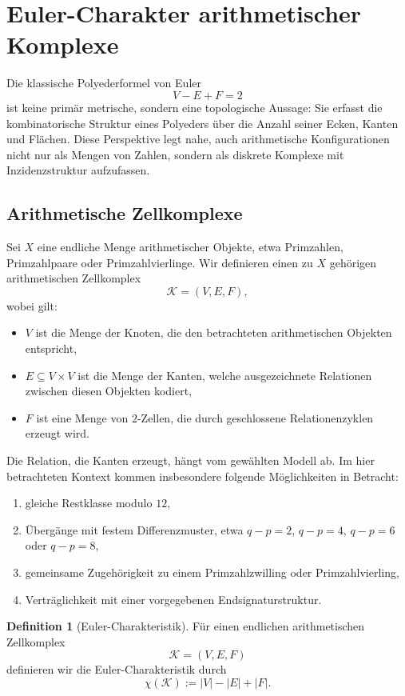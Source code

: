 \documentclass[11pt,a4paper]{article}
\theoremstyle{definition}
\newtheorem{definition}{Definition}[section]
\theoremstyle{plain}
\theoremstyle{remark}
\begin{document}
	\section{Euler-Charakter arithmetischer Komplexe}
	
	Die klassische Polyederformel von Euler
	\[
	V-E+F=2
	\]
	ist keine primär metrische, sondern eine topologische Aussage: Sie erfasst die kombinatorische Struktur eines Polyeders über die Anzahl seiner Ecken, Kanten und Flächen. Diese Perspektive legt nahe, auch arithmetische Konfigurationen nicht nur als Mengen von Zahlen, sondern als diskrete Komplexe mit Inzidenzstruktur aufzufassen.
	
	\subsection{Arithmetische Zellkomplexe}
	
	Sei \(X\) eine endliche Menge arithmetischer Objekte, etwa Primzahlen, Primzahlpaare oder Primzahlvierlinge. Wir definieren einen zu \(X\) gehörigen arithmetischen Zellkomplex
	\[
	\mathcal{K}=(V,E,F),
	\]
	wobei gilt:
	\begin{itemize}
		\item \(V\) ist die Menge der Knoten, die den betrachteten arithmetischen Objekten entspricht,
		\item \(E\subseteq V\times V\) ist die Menge der Kanten, welche ausgezeichnete Relationen zwischen diesen Objekten kodiert,
		\item \(F\) ist eine Menge von \(2\)-Zellen, die durch geschlossene Relationenzyklen erzeugt wird.
	\end{itemize}
	
	Die Relation, die Kanten erzeugt, hängt vom gewählten Modell ab. Im hier betrachteten Kontext kommen insbesondere folgende Möglichkeiten in Betracht:
	\begin{enumerate}
		\item gleiche Restklasse modulo \(12\),
		\item Übergänge mit festem Differenzmuster, etwa \(q-p=2\), \(q-p=4\), \(q-p=6\) oder \(q-p=8\),
		\item gemeinsame Zugehörigkeit zu einem Primzahlzwilling oder Primzahlvierling,
		\item Verträglichkeit mit einer vorgegebenen Endsignaturstruktur.
	\end{enumerate}
	
	\begin{definition}[Euler-Charakteristik]
		Für einen endlichen arithmetischen Zellkomplex
		\[
		\mathcal{K}=(V,E,F)
		\]
		definieren wir die Euler-Charakteristik durch
		\[
		\chi(\mathcal{K}) := |V|-|E|+|F|.
		\]
	\end{definition}
	
\end{document}

